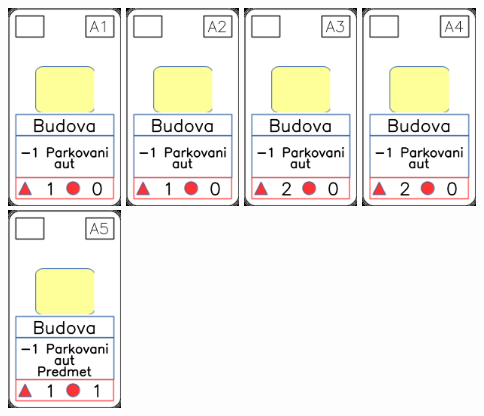 \documentclass[a4paper]{article}
\begin{document}
	\includegraphics[width=3.0cm]{img-2_0}
	\includegraphics[width=3.0cm]{img-2_1}
	\includegraphics[width=3.0cm]{img-2_2}
	\includegraphics[width=3.0cm]{img-2_3}
	\includegraphics[width=3.0cm]{img-2_4}
\end{document}
